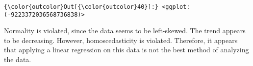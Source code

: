\documentclass[11pt]{article}
\begin{document}
    \begin{center}
    \end{center}
    { \hspace*{\fill} \\}
    
\begin{Verbatim}[commandchars=\\\{\}]
{\color{outcolor}Out[{\color{outcolor}40}]:} <ggplot: (-9223372036568736838)>
\end{Verbatim}
            
    Normality is violated, since the data seems to be left-skewed. The trend
appears to be decreasing. However, homoscedasticity is violated.
Therefore, it appears that applying a linear regression on this data is
not the best method of analyzing the data.
\end{document}
